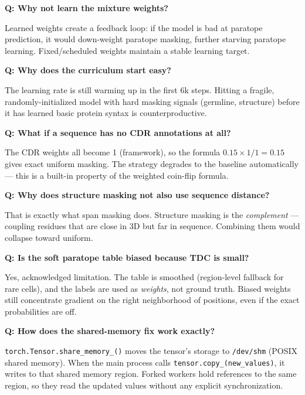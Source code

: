 \documentclass[11pt]{article}
\begin{document}
\textbf{Q: Why not learn the mixture weights?}

Learned weights create a feedback loop: if the model is bad at
paratope prediction, it would down-weight paratope masking,
further starving paratope learning. Fixed/scheduled weights
maintain a stable learning target.

\textbf{Q: Why does the curriculum start easy?}

The learning rate is still warming up in the first 6k steps.
Hitting a fragile, randomly-initialized model with hard masking
signals (germline, structure) before it has learned basic protein
syntax is counterproductive.

\textbf{Q: What if a sequence has no CDR annotations at all?}

The CDR weights all become 1 (framework), so the formula
$0.15 \times 1/1 = 0.15$ gives exact uniform masking. The
strategy degrades to the baseline automatically --- this is a
built-in property of the weighted coin-flip formula.

\textbf{Q: Why does structure masking not also use sequence
distance?}

That is exactly what span masking does. Structure masking is the
\emph{complement} --- coupling residues that are close in 3D but
far in sequence. Combining them would collapse toward uniform.

\textbf{Q: Is the soft paratope table biased because TDC is small?}

Yes, acknowledged limitation. The table is smoothed (region-level
fallback for rare cells), and the labels are used as
\emph{weights}, not ground truth. Biased weights still
concentrate gradient on the right neighborhood of positions, even
if the exact probabilities are off.

\textbf{Q: How does the shared-memory fix work exactly?}

\texttt{torch.Tensor.share\_memory\_()} moves the tensor's
storage to \texttt{/dev/shm} (POSIX shared memory). When the
main process calls \texttt{tensor.copy\_(new\_values)}, it writes
to that shared memory region. Forked workers hold references to
the same region, so they read the updated values without any
explicit synchronization.
\end{document}
